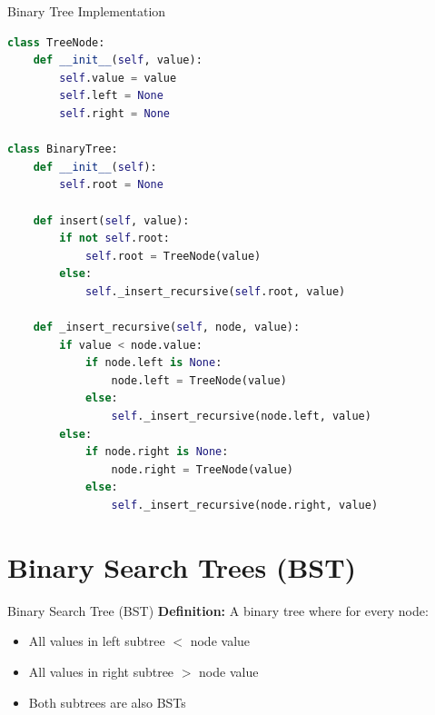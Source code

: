 \documentclass[aspectratio=169]{beamer}
\begin{document}
\begin{frame}[fragile]{Binary Tree Implementation}
  \begin{lstlisting}[language=Python, basicstyle=\ttfamily\small]
class TreeNode:
    def __init__(self, value):
        self.value = value
        self.left = None
        self.right = None

class BinaryTree:
    def __init__(self):
        self.root = None

    def insert(self, value):
        if not self.root:
            self.root = TreeNode(value)
        else:
            self._insert_recursive(self.root, value)

    def _insert_recursive(self, node, value):
        if value < node.value:
            if node.left is None:
                node.left = TreeNode(value)
            else:
                self._insert_recursive(node.left, value)
        else:
            if node.right is None:
                node.right = TreeNode(value)
            else:
                self._insert_recursive(node.right, value)
  \end{lstlisting}
\end{frame}

\section{Binary Search Trees (BST)}

\begin{frame}{Binary Search Tree (BST)}
  \textbf{Definition:} A binary tree where for every node:
  \begin{itemize}
    \item All values in left subtree $<$ node value
    \item All values in right subtree $>$ node value
    \item Both subtrees are also BSTs
  \end{itemize}

  \vspace{0.3cm}
  \begin{center}
  \end{center}
\end{frame}
\end{document}
